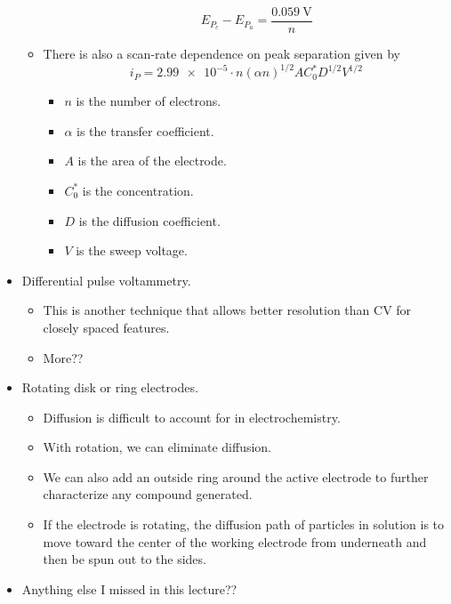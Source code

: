 \documentclass[../notes.tex]{subfiles}
\begin{document}
\begin{itemize}
\begin{itemize}
\begin{itemize}
\begin{equation*}
                E_{P_c}-E_{P_a} = \frac{\SI{0.059}{\volt}}{n}
            \end{equation*}
        \end{itemize}
        \item There is also a scan-rate dependence on peak separation given by
        \begin{equation*}
            i_P = \num{2.99e-5}\cdot n(\alpha n)^{1/2}AC_0^*D^{1/2}V^{1/2}
        \end{equation*}
        \begin{itemize}
            \item $n$ is the number of electrons.
            \item $\alpha$ is the transfer coefficient.
            \item $A$ is the area of the electrode.
            \item $C_0^*$ is the concentration.
            \item $D$ is the diffusion coefficient.
            \item $V$ is the sweep voltage.
        \end{itemize}
    \end{itemize}
    \item Differential pulse voltammetry.
    \begin{itemize}
        \item This is another technique that allows better resolution than CV for closely spaced features.
        \item More??
    \end{itemize}
    \item Rotating disk or ring electrodes.
    \begin{itemize}
        \item Diffusion is difficult to account for in electrochemistry.
        \item With rotation, we can eliminate diffusion.
        \item We can also add an outside ring around the active electrode to further characterize any compound generated.
        \item If the electrode is rotating, the diffusion path of particles in solution is to move toward the center of the working electrode from underneath and then be spun out to the sides.
    \end{itemize}
    \item Anything else I missed in this lecture??
\end{itemize}
\end{document}
